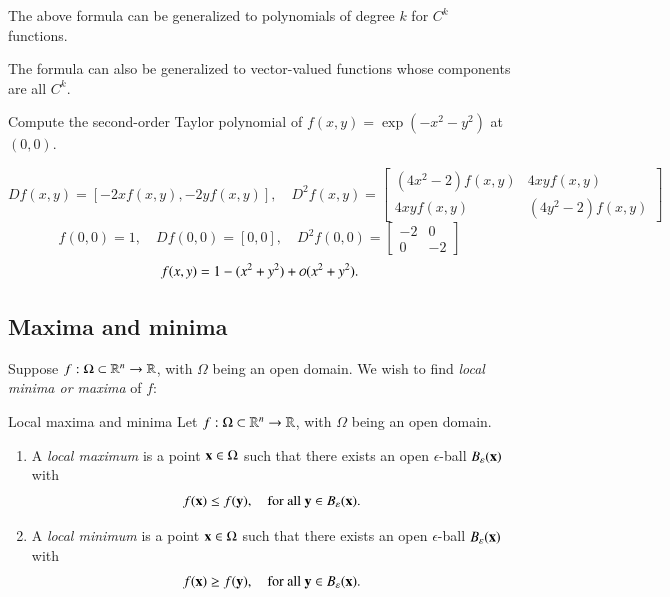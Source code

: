 The above formula can be generalized to polynomials of degree $k$ for $C^k$ functions.

The formula can also be generalized to vector-valued functions whose components are all $C^k$.

\begin{myExample}{}{}
    Compute the second-order Taylor polynomial of $f(x,y) = \exp(-x^2 - y^2)$ at $(0,0)$.

    \begin{equation}
    Df(x,y) = [-2x f(x,y), -2y f(x,y)], \quad D^2 f(x,y) = \begin{bmatrix} (4x^2 -2)f(x,y) & 4xy f(x,y) \\ 4xy f(x,y) & (4y^2 - 2)f(x,y) \end{bmatrix}
    \end{equation}
    \begin{equation}
    f(0,0) = 1, \quad Df(0,0) = [0,0], \quad D^2 f(0,0) = \begin{bmatrix} -2 & 0 \\ 0 & -2 \end{bmatrix}
    \end{equation}
    \begin{equation}
        f(x,y) = 1 - (x^2 + y^2) + \smallO(x^2 + y^2).
    \end{equation}
\end{myExample}

\subsection{Maxima and minima}

Suppose $f : \Omega \subset \mathbb{R}^n \to \mathbb{R}$, with $\Omega$ being an open domain. We wish to find \emph{local minima or maxima} of $f$:
\begin{myDefinition}{Local maxima and minima}
Let $f : \Omega \subset \mathbb{R}^n \to \mathbb{R}$, with $\Omega$ being an open domain. 
\begin{enumerate}
    \item 
A \emph{local maximum}  is a point $\mathbf{x}\in\Omega$ such that there exists an open $\epsilon$-ball $B_{\varepsilon}(\mathbf{x})$ with
\begin{equation}
    f(\mathbf{x}) \leq f(\mathbf{y}), \quad \text{for all } \mathbf{y}\in B_\varepsilon(\mathbf{x}).
\end{equation}
    \item 
A \emph{local minimum}  is a point $\mathbf{x}\in\Omega$ such that there exists an open $\epsilon$-ball $B_{\varepsilon}(\mathbf{x})$ with
\begin{equation}
    f(\mathbf{x}) \geq f(\mathbf{y}), \quad \text{for all } \mathbf{y}\in B_\varepsilon(\mathbf{x}).
\end{equation}
\end{enumerate}
\end{myDefinition}

